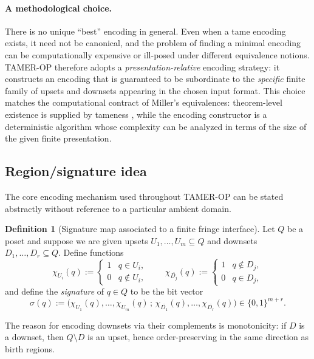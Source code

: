 \documentclass{article}
\newcommand{\<}{\langle}
\renewcommand{\>}{\rangle}
\theoremstyle{definition}
\newtheorem{defn}[theorem]{Definition}
\theoremstyle{remark}
\begin{document}
	\paragraph{A methodological choice.}
	There is no unique ``best'' encoding in general.  Even when a tame encoding exists,
	it need not be canonical, and the problem of finding a minimal encoding can be
	computationally expensive or ill-posed under different equivalence notions.
	TAMER-OP therefore adopts a \emph{presentation-relative} encoding strategy:
	it constructs an encoding that is guaranteed to be subordinate to the \emph{specific}
	finite family of upsets and downsets appearing in the chosen input format.  This
	choice matches the computational contract of Miller's equivalences:
	theorem-level existence is supplied by tameness \cite{Mil20}, while the encoding
	constructor is a deterministic algorithm whose complexity can be analyzed in terms
	of the size of the given finite presentation.
	
	\subsection{Region/signature idea}
	\label{subsec:signature-idea}
	
	The core encoding mechanism used throughout TAMER-OP can be stated abstractly
	without reference to a particular ambient domain.
	
	\begin{defn}[Signature map associated to a finite fringe interface]
		\label{def:signature-map}
		Let $Q$ be a poset and suppose we are given upsets $U_1,\dots,U_m\subseteq Q$
		and downsets $D_1,\dots,D_r\subseteq Q$.
		Define functions
		\[
		\chi_{U_i}(q) :=
		\begin{cases}
			1 & q\in U_i,\\
			0 & q\notin U_i,
		\end{cases}
		\qquad
		\chi_{\overline{D_j}}(q) :=
		\begin{cases}
			1 & q\notin D_j,\\
			0 & q\in D_j,
		\end{cases}
		\]
		and define the \emph{signature} of $q\in Q$ to be the bit vector
		\[
		\sigma(q) := \big(\chi_{U_1}(q),\dots,\chi_{U_m}(q)\,;\,
		\chi_{\overline{D_1}}(q),\dots,\chi_{\overline{D_r}}(q)\big)\in \{0,1\}^{m+r}.
		\]
	\end{defn}
	
	The reason for encoding downsets via their complements is monotonicity: if $D$ is
	a downset, then $Q\setminus D$ is an upset, hence order-preserving in the same
	direction as birth regions.
	
\end{document}
